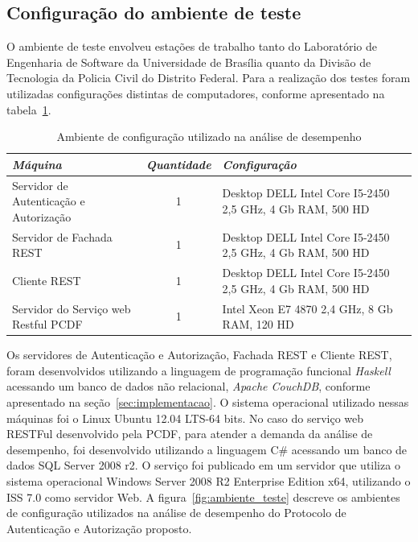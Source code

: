 \subsection{Configuração do ambiente de teste}

O ambiente de teste envolveu estações de trabalho tanto do Laboratório de Engenharia de Software da Universidade de Brasília quanto da Divisão de Tecnologia da Policia Civil do Distrito Federal. Para a realização dos testes foram utilizadas configurações distintas de computadores, conforme apresentado na tabela~\ref{tb:estudo_caso1}.

\begin{table}[h]
\begin{center}
    \begin{tabular}{|p{6cm}|c|p{6cm}|}
    \hline
    \textbf{\emph{Máquina }}                   & \textbf{\emph{Quantidade}} & \textbf{\emph{Configuração}}                                                                               \\ \hline
    Servidor de Autenticação e Autorização     & 1          & Desktop DELL Intel Core I5-2450 2,5 GHz, 4 Gb RAM, 500 HD \\ \hline
    Servidor de Fachada REST                   & 1          & Desktop DELL Intel Core I5-2450 2,5 GHz, 4 Gb RAM, 500 HD \\ \hline
    Cliente REST                               & 1          & Desktop DELL Intel Core I5-2450 2,5 GHz, 4 Gb RAM, 500 HD \\ \hline
    Servidor do Serviço web Restful PCDF       & 1          & Intel Xeon E7 4870 2,4 GHz, 8 Gb RAM, 120 HD \\ \hline
    \end{tabular}
    \caption {Ambiente de configuração utilizado na análise de desempenho}\label{tb:estudo_caso1}
\end{center}
\end{table}

Os servidores de Autenticação e Autorização, Fachada REST e Cliente REST, foram desenvolvidos utilizando a linguagem de programação funcional \emph{Haskell} acessando um banco de dados não relacional, \emph{Apache CouchDB}, conforme apresentado na seção~\ref{sec:implementacao}. O sistema operacional utilizado nessas máquinas foi o Linux Ubuntu 12.04 LTS-64 bits. No caso do serviço web RESTFul desenvolvido pela PCDF, para atender a demanda da análise de desempenho, foi desenvolvido utilizando a linguagem C\# acessando um banco de dados SQL Server 2008 r2. O serviço foi publicado em um servidor que utiliza o sistema operacional Windows Server 2008 R2 Enterprise Edition x64, utilizando o ISS 7.0 como servidor Web. A figura~\ref{fig:ambiente_teste} descreve os ambientes de configuração utilizados na análise de desempenho do Protocolo de Autenticação e Autorização proposto.


